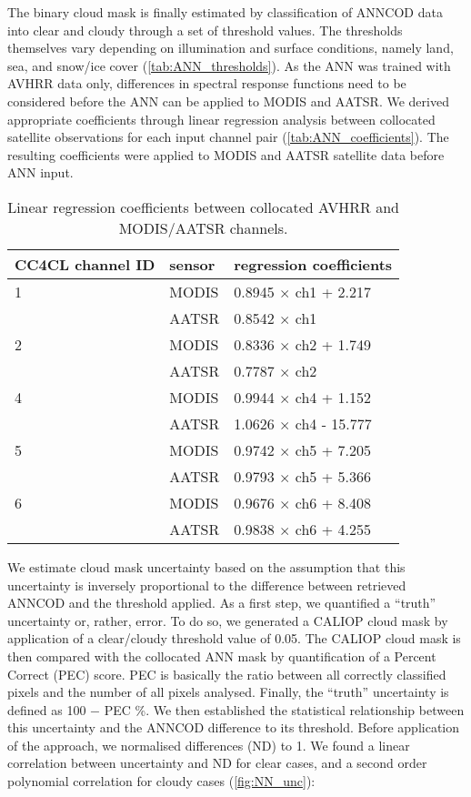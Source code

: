 The binary cloud mask is finally estimated by classification of ANNCOD data into clear and cloudy through a set of threshold values. The thresholds themselves vary depending on illumination and surface conditions, namely land, sea, and snow/ice cover (\autoref{tab:ANN_thresholds}). As the ANN was trained with AVHRR data only, differences in spectral response functions need to be considered before the ANN can be applied to MODIS and AATSR. We derived appropriate coefficients through linear regression analysis between collocated satellite observations for each input channel pair (\autoref{tab:ANN_coefficients}). The resulting coefficients were applied to MODIS and AATSR satellite data before ANN input.

\begin{table}[h]
  \caption{Linear regression coefficients between collocated AVHRR and MODIS/AATSR channels.}
  \begin{tabular}{l|l|l} %
    \hline
    CC4CL channel ID & sensor & regression coefficients \\
    \hline
    1 & MODIS & 0.8945 $\times$ ch1 + 2.217 \\
    & AATSR & 0.8542 $\times$ ch1 \\ \hline
    2 & MODIS & 0.8336 $\times$ ch2 + 1.749 \\
    & AATSR & 0.7787 $\times$ ch2 \\ \hline
    4 & MODIS & 0.9944 $\times$ ch4 + 1.152 \\
    & AATSR & 1.0626 $\times$ ch4 - 15.777 \\ \hline
    5 & MODIS & 0.9742 $\times$ ch5 + 7.205 \\
    & AATSR & 0.9793 $\times$ ch5 + 5.366 \\ \hline
    6 & MODIS & 0.9676 $\times$ ch6 + 8.408 \\
    & AATSR & 0.9838 $\times$ ch6 + 4.255 \\
    \hline
  \end{tabular}
  \label{tab:ANN_coefficients}
\end{table}

We estimate cloud mask uncertainty based on the assumption that this uncertainty is inversely proportional to the difference between retrieved ANNCOD and the threshold applied. As a first step, we quantified a ``truth'' uncertainty or, rather, error. To do so, we generated a CALIOP cloud mask by application of a clear/cloudy threshold value of 0.05. The CALIOP cloud mask is then compared with the collocated ANN mask by quantification of a Percent Correct (PEC) score. PEC is basically the ratio between all correctly classified pixels and the number of all pixels analysed. Finally, the ``truth'' uncertainty is defined as 100 $-$ PEC \%. We then established the statistical relationship between this uncertainty and the ANNCOD difference to its threshold. Before application of the approach, we normalised differences (ND) to 1. We found a linear correlation between uncertainty and ND for clear cases, and a second order polynomial correlation for cloudy cases (\autoref{fig:NN_unc}):

